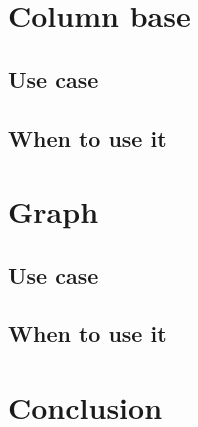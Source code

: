 \documentclass{CRPITStyle}
\begin{document}

\section{Column base}

\subsection{Use case}

\subsection{When to use it}


\section{Graph}

\subsection{Use case}

\subsection{When to use it}

\section{Conclusion}




\end{document}

